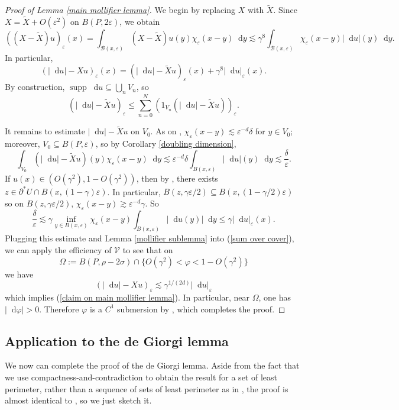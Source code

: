 \documentclass[reqno,11pt]{amsart}
\DeclareMathOperator{\supp}{supp}
\newcommand*\dif{\mathop{}\!\mathrm{d}}
\theoremstyle{definition}
\numberwithin{equation}{section}
\begin{document}
\begin{proof}[Proof of Lemma \ref{main mollifier lemma}]
We begin by replacing $X$ with $\tilde X$.
Since $X = \tilde X + O(\varepsilon^2)$ on $B(P, 2\varepsilon)$, we obtain
$$((X - \tilde X)u)_\varepsilon(x) = \int_{\mathcal B(x, \varepsilon)} (X - \tilde X)u(y) \chi_\varepsilon(x - y) \dif y \lesssim \gamma^8 \int_{\mathcal B(x, \varepsilon)} \chi_\varepsilon(x - y) |\dif u|(y) \dif y.$$
In particular,  
$$(|\dif u| - Xu)_\varepsilon(x) = (|\dif u| - \tilde Xu)_\varepsilon(x) + \gamma^8 |\dif u|_\varepsilon(x).$$
By construction, $\supp \dif u \subseteq \bigcup_n V_n$, so
\begin{equation}\label{sum over cover}
(|\dif u| - \tilde Xu)_\varepsilon \leq \sum_{n = 0}^N (1_{V_n} (|\dif u| - \tilde Xu))_\varepsilon.
\end{equation}

It remains to estimate $|\dif u| - \tilde Xu$ on $V_0$.
As on \cite[92]{Giusti77}, $\chi_\varepsilon(x - y) \lesssim \varepsilon^{-d} \delta$ for $y \in V_0$; moreover, $V_0 \subseteq B(P, \varepsilon)$, so by Corollary \ref{doubling dimension},
$$\int_{V_0} (|\dif u| - \tilde Xu)(y) \chi_\varepsilon(x - y) \dif y \lesssim \varepsilon^{-d} \delta \int_{B(x, \varepsilon)} |\dif u|(y) \dif y \lesssim \frac{\delta}{\varepsilon}.$$
If $u(x) \in (O(\gamma^2), 1 - O(\gamma^2))$, then by \cite[Lemma 7.1]{Giusti77}, there exists $z \in \partial^* U \cap B(x, (1 - \gamma)\varepsilon)$.
In particular, $B(z, \gamma\varepsilon/2) \subseteq B(x, (1 - \gamma/2)\varepsilon)$ so on $B(z, \gamma\varepsilon/2)$, $\chi_\varepsilon(x - y) \gtrsim \varepsilon^{-d} \gamma$.
So 
$$\frac{\delta}{\varepsilon} \lesssim \gamma \inf_{y \in B(x, \varepsilon)} \chi_\varepsilon(x - y) \int_{B(x, \varepsilon)} |\dif u(y)| \dif y \leq \gamma |\dif u|_\varepsilon(x).$$
Plugging this estimate and Lemma \ref{mollifier sublemma} into (\ref{sum over cover}), we can apply the efficiency of $\mathcal V$ to see that on
$$\Omega := B(P, \rho - 2\sigma) \cap \{O(\gamma^2) < \varphi < 1 - O(\gamma^2)\}$$
we have
$$(|\dif u| - Xu)_\varepsilon \lesssim \gamma^{1/(2d)} |\dif u|_\varepsilon$$
which implies (\ref{claim on main mollifier lemma}).
In particular, near $\Omega$, one has $|\dif \varphi| > 0$.
Therefore $\varphi$ is a $C^1$ submersion by \cite[Lemma 7.1]{Giusti77}, which completes the proof.
\end{proof}

\subsection{Application to the de Giorgi lemma}
We now can complete the proof of the de Giorgi lemma.
Aside from the fact that we use compactness-and-contradiction to obtain the result for a set of least perimeter, rather than a sequence of sets of least perimeter as in \cite{Giusti77, Miranda66}, the proof is almost identical to \cite[Lemma 7.5]{Giusti77}, so we just sketch it.
\end{document}
